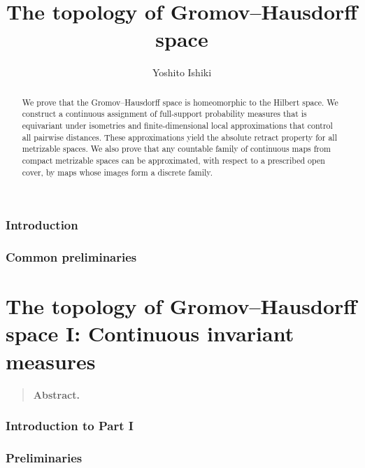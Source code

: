 \documentclass[11pt,reqno]{amsart}
\title{The topology of Gromov--Hausdorff space}
\author{Yoshito Ishiki}
\date{}
\begin{document}
\raggedbottom

\begin{abstract}
We prove that the  Gromov--Hausdorff space is homeomorphic to the  Hilbert space. We construct a continuous assignment of full-support probability measures that is equivariant under isometries and finite-dimensional local approximations that control all pairwise distances. These approximations yield the absolute retract property for all metrizable spaces. We also prove that any countable family of continuous maps from compact metrizable spaces can be approximated, with respect to a prescribed open cover, by maps whose images form a discrete family.
\end{abstract}

\maketitle
\tableofcontents

\section{Introduction}\label{sec:introduction}


\section{Common preliminaries}\label{sec:preliminaries}






\clearpage
\part{The topology of Gromov--Hausdorff space I: Continuous invariant measures}\label{part:measures}
\begin{quote}
\small
\noindent\textbf{Abstract.}

\end{quote}

\section{Introduction to Part I}\label{sec:intro-measures}


\section{Preliminaries}\label{sec:prelim-measures}



\end{document}
